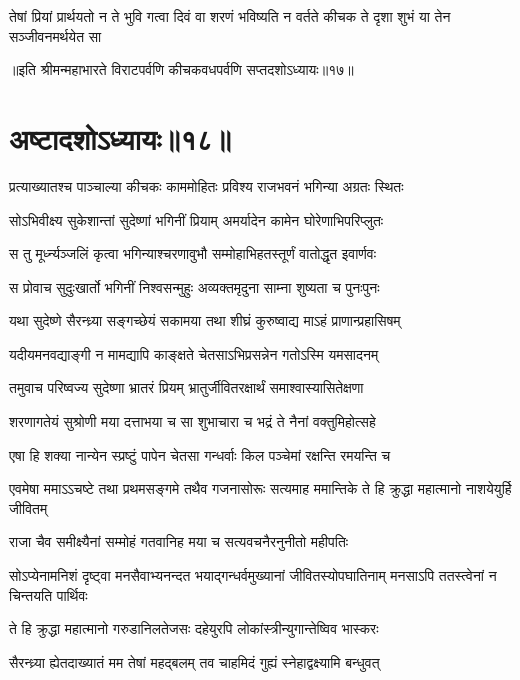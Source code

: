 \fourlineindentedshloka
{तेषां प्रियां प्रार्थयतो न ते भुवि}
{गत्वा दिवं वा शरणं भविष्यति}
{न वर्तते कीचक ते दृशा शुभं}
{या तेन सञ्जीवनमर्थयेत सा}

॥इति श्रीमन्महाभारते विराटपर्वणि कीचकवधपर्वणि सप्तदशोऽध्यायः॥१७॥

\chapter{अष्टादशोऽध्यायः॥१८॥}

\twolineshloka
{प्रत्याख्यातश्च पाञ्चाल्या कीचकः काममोहितः}
{प्रविश्य राजभवनं भगिन्या अग्रतः स्थितः}


\twolineshloka
{सोऽभिवीक्ष्य सुकेशान्तां सुदेष्णां भगिनीं प्रियाम्}
{अमर्यादेन कामेन घोरेणाभिपरिप्लुतः}


\twolineshloka
{स तु मूर्ध्न्यञ्जलिं कृत्वा भगिन्याश्चरणावुभौ}
{सम्मोहाभिहतस्तूर्णं वातोद्धृत इवार्णवः}


\twolineshloka
{स प्रोवाच सुदुःखार्तो भगिनीं निश्वसन्मुहुः}
{अव्यक्तमृदुना साम्ना शुष्यता च पुनःपुनः}


\twolineshloka
{यथा सुदेष्णे सैरन्ध्र्या सङ्गच्छेयं सकामया}
{तथा शीघ्रं कुरुष्वाद्य माऽहं प्राणान्प्रहासिषम्}


\twolineshloka
{यदीयमनवद्याङ्गी न मामद्यापि काङ्क्षते}
{चेतसाऽभिप्रसन्नेन गतोऽस्मि यमसादनम्}



\twolineshloka
{तमुवाच परिष्वज्य सुदेष्णा भ्रातरं प्रियम्}
{भ्रातुर्जीवितरक्षार्थं समाश्वास्यासितेक्षणा}


\twolineshloka
{शरणागतेयं सुश्रोणी मया दत्ताभया च सा}
{शुभाचारा च भद्रं ते नैनां वक्तुमिहोत्सहे}


\twolineshloka
{एषा हि शक्या नान्येन स्प्रष्टुं पापेन चेतसा}
{गन्धर्वाः किल पञ्चेमां रक्षन्ति रमयन्ति च}


\threelineshloka
{एवमेषा ममाऽऽचष्टे तथा प्रथमसङ्गमे}
{तथैव गजनासोरूः सत्यमाह ममान्तिके}
{ते हि क्रुद्धा महात्मानो नाशयेयुर्हि जीवितम्}


\twolineshloka
{राजा चैव समीक्ष्यैनां सम्मोहं गतवानिह}
{मया च सत्यवचनैरनुनीतो महीपतिः}


\threelineshloka
{सोऽप्येनामनिशं दृष्ट्वा मनसैवाभ्यनन्दत}
{भयाद्गन्धर्वमुख्यानां जीवितस्योपघातिनाम्}
{मनसाऽपि ततस्त्वेनां न चिन्तयति पार्थिवः}


\twolineshloka
{ते हि क्रुद्धा महात्मानो गरुडानिलतेजसः}
{दहेयुरपि लोकांस्त्रीन्युगान्तेष्विव भास्करः}


\twolineshloka
{सैरन्ध्र्या ह्येतदाख्यातं मम तेषां महद्बलम्}
{तव चाहमिदं गुह्यं स्नेहाद्वक्ष्यामि बन्धुवत्}


